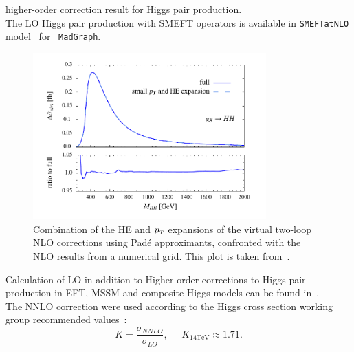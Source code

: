higher-order correction result for Higgs pair production.\\
%
The LO Higgs pair production with SMEFT operators is available in \texttt{SMEFTatNLO} model~\cite{Degrande:2020evl} for ~\texttt{MadGraph}.

\begin{figure}[!htpb]
	\centering
	\includegraphics[width = 0.8\textwidth]{./figures/HH_NLO}
	\caption{Combination of the HE and $p_{\scriptscriptstyle T}$ expansions of the virtual two-loop NLO corrections using  Pad\'e  approximants,  confronted with the NLO results from a numerical grid. This plot is taken from~\cite{Bellafronte:2022jmo}. } 
	\label{dihiggs-gridplot}
\end{figure}
%
Calculation of LO in addition to Higher order corrections to Higgs pair production in EFT, MSSM and composite Higgs models can be found in~\cite{Grober:2010yv,Grober:2014zva,Grober:2015cwa,Grober:2017gut,deFlorian:2017qfk,Buchalla:2018yce}.\\ 
The NNLO correction were used according to the Higgs cross section working group recommended values~\cite{Dittmaier:2012vm,deFlorian:2016spz}:
\begin{equation}
	K = \frac{\sigma_{NNLO}}{\sigma_{LO}}, \;\;\;\;\; K_{14 \mathrm{TeV}} \approx 1.71.
\end{equation}
